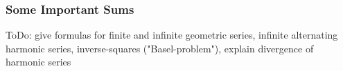 





\subsubsection{Some Important Sums}
ToDo: give formulas for finite and infinite geometric series, infinite alternating harmonic series, inverse-squares ("Basel-problem"), explain divergence of harmonic series


